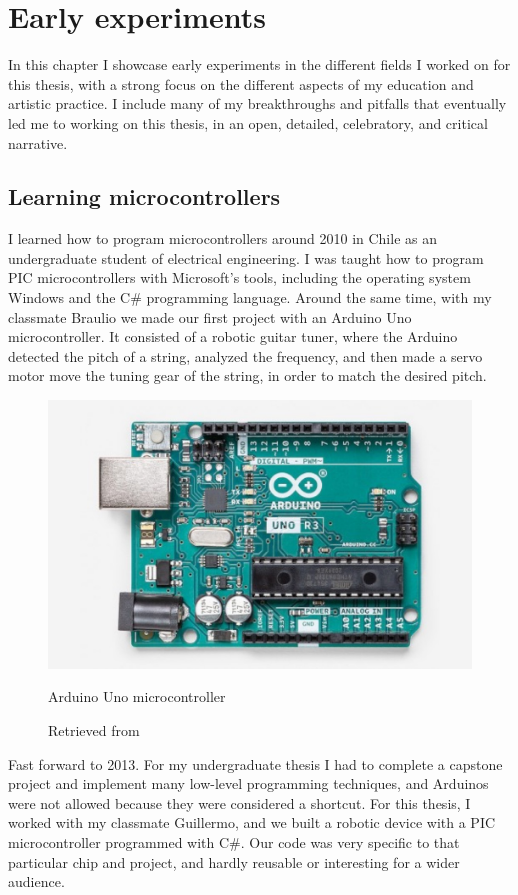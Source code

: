 \chapter{Early experiments}

In this chapter I showcase early experiments in the different fields I worked on for this thesis, with a strong focus on the different aspects of my education and artistic practice.  I include many of my breakthroughs and pitfalls that eventually led me to working on this thesis, in an open, detailed, celebratory, and critical narrative.

\section{Learning microcontrollers}

I learned how to program microcontrollers around 2010 in Chile as an undergraduate student of electrical engineering. I was taught how to program PIC microcontrollers with Microsoft's tools, including the operating system Windows and the C\# programming language. Around the same time, with my classmate Braulio we made our first project with an Arduino Uno microcontroller. It consisted of a robotic guitar tuner, where the Arduino detected the pitch of a string, analyzed the frequency, and then made a servo motor move the tuning gear of the string, in order to match the desired pitch.

\begin{figure}[ht]
  \centering
  \includegraphics[width=0.75\linewidth,height=0.25\textheight,keepaspectratio]{images/arduino-uno.jpg}
  \caption{Arduino Uno microcontroller}
  \caption*{Retrieved from \cite{website-arduino-uno}}
  \label{fig:arduino-uno}
\end{figure}

Fast forward to 2013. For my undergraduate thesis I had to complete a capstone project and implement many low-level programming techniques, and Arduinos were not allowed because they were considered a shortcut. For this thesis, I worked with my classmate Guillermo, and we built a robotic device with a \acrshort{PIC} microcontroller programmed with C\#. Our code was very specific to that particular chip and project, and hardly reusable or interesting for a wider audience.

